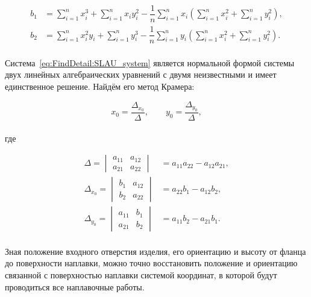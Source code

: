 \begin{align*}
    b_1 &= \sum_{i=1}^{n} x_i^3 + \sum_{i=1}^{n} x_i y_i^2
    - \dfrac{1}{n} \sum_{i=1}^{n} x_i \left(
    \sum_{i=1}^{n} x_i^2 + \sum_{i=1}^{n} y_i^2 \right), \\
    b_2 &= \sum_{i=1}^{n} x_i^2 y_i + \sum_{i=1}^{n} y_i^3
    - \dfrac{1}{n} \sum_{i=1}^{n} y_i \left(
    \sum_{i=1}^{n} x_i^2 + \sum_{i=1}^{n} y_i^2 \right).
\end{align*} \\

Система~\ref{eq:FindDetail:SLAU_system} является нормальной формой системы двух линейных алгебраических уравнений с двумя неизвестными и имеет единственное решение.
Найдём его метод Крамера:

\begin{equation*}
    x_0 = \dfrac{\Delta_{x_0}}{\Delta}, \qquad
    y_0 = \dfrac{\Delta_{y_0}}{\Delta},
\end{equation*} \\
где

\begin{align*}
    \Delta = \begin{vmatrix}
                 a_{11} & a_{12} \\
                 a_{21} & a_{22}
    \end{vmatrix} &= a_{11} a_{22} - a_{12} a_{21}, \\
    \Delta_{x_0} = \begin{vmatrix}
                       b_1 & a_{12} \\
                       b_2 & a_{22}
    \end{vmatrix} &= a_{22} b_1 - a_{12} b_2, \\
    \Delta_{y_0} = \begin{vmatrix}
                       a_{11} & b_1 \\
                       a_{21} & b_2
    \end{vmatrix} &= a_{11} b_2 - a_{21} b_1.
\end{align*} \\

Зная положение входного отверстия изделия, его ориентацию и высоту от фланца до поверхности наплавки, можно точно восстановить положение и ориентацию связанной с поверхностью наплавки системой координат, в которой будут проводиться все наплавочные работы.
